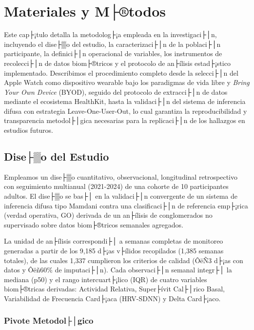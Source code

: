 ﻿\chapter{Materiales y M├®todos}
\label{chap:materiales_metodos}

\noindent Este cap├¡tulo detalla la metodolog├¡a empleada en la investigaci├│n, incluyendo el dise├▒o del estudio, la caracterizaci├│n de la poblaci├│n participante, la definici├│n operacional de variables, los instrumentos de recolecci├│n de datos biom├®tricos y el protocolo de an├ílisis estad├¡stico implementado. Describimos el procedimiento completo desde la selecci├│n del Apple Watch como dispositivo wearable bajo los paradigmas de vida libre y \textit{Bring Your Own Device} (BYOD), seguido del protocolo de extracci├│n de datos mediante el ecosistema HealthKit, hasta la validaci├│n del sistema de inferencia difusa con estrategia Leave-One-User-Out, lo cual garantiza la reproducibilidad y transparencia metodol├│gica necesarias para la replicaci├│n de los hallazgos en estudios futuros.

\section{Dise├▒o del Estudio}
\label{sec:diseno}

Empleamos un dise├▒o cuantitativo, observacional, longitudinal retrospectivo con seguimiento multianual (2021-2024) de una cohorte de 10 participantes adultos. El dise├▒o se bas├│ en la validaci├│n convergente de un sistema de inferencia difusa tipo Mamdani contra una clasificaci├│n de referencia emp├¡rica (verdad operativa, GO) derivada de un an├ílisis de conglomerados no supervisado sobre datos biom├®tricos semanales agregados.

La unidad de an├ílisis correspondi├│ a semanas completas de monitoreo generadas a partir de los 9,185 d├¡as v├ílidos recopilados (1,385 semanas totales), de las cuales 1,337 cumplieron los criterios de calidad (ÔëÑ3 d├¡as con datos y Ôëñ60\% de imputaci├│n). Cada observaci├│n semanal integr├│ la mediana (p50) y el rango intercuart├¡lico (IQR) de cuatro variables biom├®tricas derivadas: Actividad Relativa, Super├ívit Cal├│rico Basal, Variabilidad de Frecuencia Card├¡aca (HRV-SDNN) y Delta Card├¡aco.

\subsection{Pivote Metodol├│gico}
\label{subsec:pivote_metodologico}

